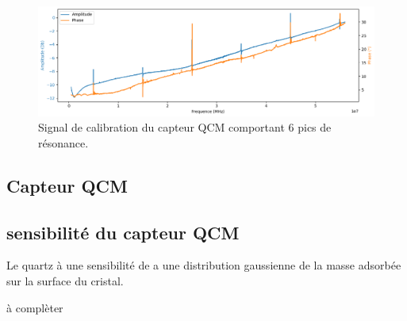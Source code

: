 \begin{figure}[H]
    \centering
    \includegraphics[width=\textwidth]{assets/figures/Calibration.png}
    \caption{Signal de calibration du capteur QCM comportant 6 pics de résonance.}
    \label{fig:calibration plot}
\end{figure}

\subsection{Capteur QCM}

\subsection{sensibilité du capteur QCM}
Le quartz à une sensibilité de a une distribution gaussienne de la masse adsorbée sur la surface du cristal.


à complèter